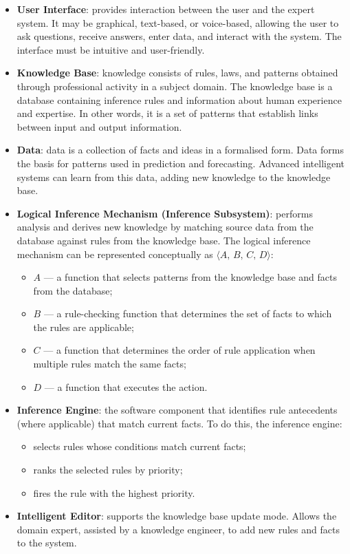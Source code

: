 \documentclass[a4paper,final]{article}
\begin{document}
\begin{itemize}
	\item \textbf{User Interface}: provides interaction between the user and the expert system. It may be graphical, text-based, or voice-based, allowing the user to ask questions, receive answers, enter data, and interact with the system. The interface must be intuitive and user-friendly.

	\item \textbf{Knowledge Base}: knowledge consists of rules, laws, and patterns obtained through professional activity in a subject domain. The knowledge base is a database containing inference rules and information about human experience and expertise. In other words, it is a set of patterns that establish links between input and output information.

	\item \textbf{Data}: data is a collection of facts and ideas in a formalised form. Data forms the basis for patterns used in prediction and forecasting. Advanced intelligent systems can learn from this data, adding new knowledge to the knowledge base.

	\item \textbf{Logical Inference Mechanism (Inference Subsystem)}: performs analysis and derives new knowledge by matching source data from the database against rules from the knowledge base. The logical inference mechanism can be represented conceptually as $\langle A,\,B,\,C,\,D \rangle$:
	\begin{itemize}
		\item $A$ --- a function that selects patterns from the knowledge base and facts from the database;
		\item $B$ --- a rule-checking function that determines the set of facts to which the rules are applicable;
		\item $C$ --- a function that determines the order of rule application when multiple rules match the same facts;
		\item $D$ --- a function that executes the action.
	\end{itemize}

	\item \textbf{Inference Engine}: the software component that identifies rule antecedents (where applicable) that match current facts. To do this, the inference engine:
	\begin{itemize}
		\item selects rules whose conditions match current facts;
		\item ranks the selected rules by priority;
		\item fires the rule with the highest priority.
	\end{itemize}

	\item \textbf{Intelligent Editor}: supports the knowledge base update mode. Allows the domain expert, assisted by a knowledge engineer, to add new rules and facts to the system.
\end{itemize}
\end{document}
